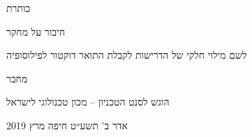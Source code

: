 \begin{hebrew}
\begin{center}

{\Huge כותרת}


{\Large חיבור על מחקר}


\parbox{30em}{
\begin{center}
לשם מילוי חלקי של הדרישות לקבלת התואר
דוקטור לפילוסופיה
\end{center}
}


{\huge מחבר}


הוגש לסנט הטכניון – מכון טכנולוגי לישראל

\parbox{16em}{
\begin{center}
אדר ב' תשע״ט \hfill חיפה \hfill מרץ 2019
\end{center}
}
\end{center}
\end{hebrew}